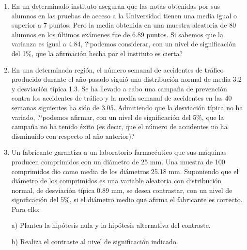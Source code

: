 \begin{adjustwidth}{20pt}{10pt}
\begin{enumerate}[PB. 1. ]	
	 
			
		
\item En un determinado instituto aseguran que las notas obtenidas por sus alumnos en las pruebas de acceso a la Universidad tienen una media igual o superior a 7 puntos. Pero la media obtenida en una muestra aleatoria de 80 alumnos en los últimos exámenes fue de 6.89 puntos. Si sabemos que la varianza es igual a 4.84, ?`podemos considerar, con un nivel de significación del 1\%, que la afirmación hecha por el instituto es cierta? 

\hspace{-15mm}\vspace{1cm}

\item En una determinada región, el número semanal de accidentes de tráfico producido durante el año pasado siguió una distribución normal de media 3.2 y desviación típica 1.3. Se ha llevado a cabo una campaña de prevención contra los accidentes de tráfico y la media semanal de accidentes en las 40 semanas siguientes ha sido de 3.05. Admitiendo que la desviación típica no ha variado, ?`podemos afirmar, con un nivel de significación del 5\%, que la campaña no ha tenido éxito (es decir, que el número de accidentes no ha disminuido con respecto al año anterior)? 

\hspace{-15mm}\vspace{1cm}

\item Un fabricante garantiza a un laboratorio farmacéutico que sus máquinas producen comprimidos con un diámetro de 25 mm. Una muestra de 100 comprimidos dio como media de los diámetros 25.18 mm. Suponiendo que el diámetro de los comprimidos es una variable aleatoria con distribución normal, de desviación típica 0.89 mm, se desea contrastar, con un nivel de significación del 5\%, si el diámetro medio que afirma el fabricante es correcto. Para ello: 

a) Plantea la hipótesis nula y la hipótesis alternativa del contraste. 

b) Realiza el contraste al nivel de significación indicado. 

\hspace{-15mm}\vspace{1cm}


\end{enumerate}
\end{adjustwidth}
